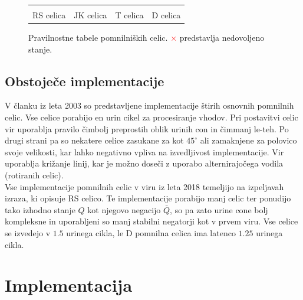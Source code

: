 \documentclass[a4paper, 11pt]{article}
\newcommand{\todo}{\textcolor{BrickRed}{\texttt{TODO}}} %
\begin{document}
\begin{figure}[h]
\begin{tabular}{cccc}
		\\ \\
		RS celica & JK celica & T celica & D celica \\
	\end{tabular}
	\caption{Pravilnostne tabele pomnilniških celic. \textcolor{Red}{$\times$} predstavlja nedovoljeno stanje.}
	\label{tab-cells-table}
\end{figure}


\subsection{Obstoječe implementacije}
V članku \cite{quantum_dot} iz leta 2003 so predstavljene implementacije štirih osnovnih pomnilnih celic. Vse celice porabijo en urin cikel za procesiranje vhodov. Pri postavitvi celic vir uporablja pravilo čimbolj preprostih oblik urinih con in čimmanj le-teh. Po drugi strani pa so nekatere celice zasukane za kot $ 45^{\circ} $ ali zamaknjene za polovico svoje velikosti, kar lahko negativno vpliva na izvedljivost implementacije. Vir uporablja križanje linij, kar je možno doseči z uporabo alternirajočega vodila (rotiranih celic). \\

Vse implementacije pomnilnih celic v viru \cite{a_novel_approach} iz leta 2018 temeljijo na izpeljavah izraza, ki opisuje RS celico. Te implementacije porabijo manj celic ter ponudijo tako izhodno stanje $Q$ kot njegovo negacijo $\bar{Q}$, so pa zato urine cone bolj kompleksne in uporabljeni so manj stabilni negatorji kot v prvem viru. Vse celice se izvedejo v $1.5$ urinega cikla, le D pomnilna celica ima latenco $1.25$ urinega cikla.



\section{Implementacija}
\end{document}
